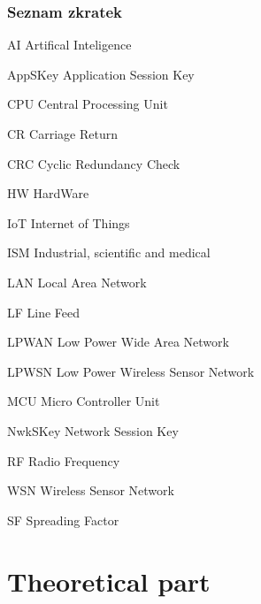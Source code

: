 \documentclass[oneside]{ctuthesis}
\theoremstyle{plain}
\theoremstyle{definition}
\theoremstyle{note}
\newcommand{\abbrlabel}[1]{\makebox[3cm][l]{\textbf{#1}\ \dotfill}}
\newenvironment{abbreviations}{\begin{list}{}{\renewcommand{\makelabel}{\abbrlabel}}}{\end{list}}
\begin{document}
\section{Seznam zkratek}
\begin{abbreviations}
	\item[AI]		Artifical Inteligence
	\item[AppSKey]	Application Session Key	
	\item[CPU]		Central Processing Unit
	\item[CR] 			Carriage Return
	\item[CRC] 			Cyclic Redundancy Check
	\item[HW]			HardWare
	\item[IoT] 		Internet of Things
	\item[ISM]		Industrial, scientific and medical 
	\item[LAN]		Local Area Network
	\item[LF]		Line Feed 
	\item[LPWAN]   	Low Power Wide Area Network 
	\item[LPWSN] 	Low Power Wireless Sensor Network	
	\item[MCU] 		Micro Controller Unit
	\item[NwkSKey]	Network Session Key
	\item[RF]		Radio Frequency
	\item[WSN]		Wireless Sensor Network

	\item[SF]		Spreading Factor
\end{abbreviations}



\part{Theoretical part}
													
\end{document}

